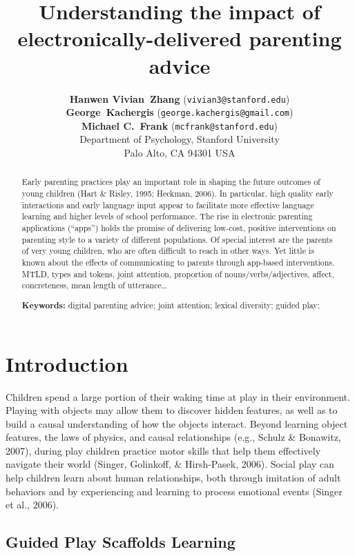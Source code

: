 \documentclass[10pt, letterpaper]{article}
\title{Understanding the impact of electronically-delivered parenting advice}
\author{{\large\bf Hanwen Vivian~Zhang} (\texttt{vivian3@stanford.edu}) \\ {\large\bf George~Kachergis} (\texttt{george.kachergis@gmail.com}) \\ {\large\bf Michael C.~Frank} (\texttt{mcfrank@stanford.edu}) \\  Department of Psychology, Stanford University \\  Palo Alto, CA 94301 USA}
\begin{document}
\maketitle

\begin{abstract}
Early parenting practices play an important role in shaping the future
outcomes of young children (Hart \& Risley, 1995; Heckman, 2006). In
particular, high quality early interactions and early language input
appear to facilitate more effective language learning and higher levels
of school performance. The rise in electronic parenting applications
(``apps'') holds the promise of delivering low-cost, positive
interventions on parenting style to a variety of different populations.
Of special interest are the parents of very young children, who are
often difficult to reach in other ways. Yet little is known about the
effects of communicating to parents through app-based interventions.
MTLD, types and tokens, joint attention, proportion of
nouns/verbs/adjectives, affect, concreteness, mean length of
utterance\ldots{}

\textbf{Keywords:}
digital parenting advice; joint attention; lexical diversity; guided
play;
\end{abstract}

\section{Introduction}\label{introduction}

Children spend a large portion of their waking time at play in their
environment. Playing with objects may allow them to discover hidden
features, as well as to build a causal understanding of how the objects
interact. Beyond learning object features, the laws of physics, and
causal relationships (e.g., Schulz \& Bonawitz, 2007), during play
children practice motor skills that help them effectively navigate their
world (Singer, Golinkoff, \& Hirsh-Pasek, 2006). Social play can help
children learn about human relationships, both through imitation of
adult behaviors and by experiencing and learning to process emotional
events (Singer et al., 2006).

\subsection{Guided Play Scaffolds
Learning}\label{guided-play-scaffolds-learning}
\end{document}
